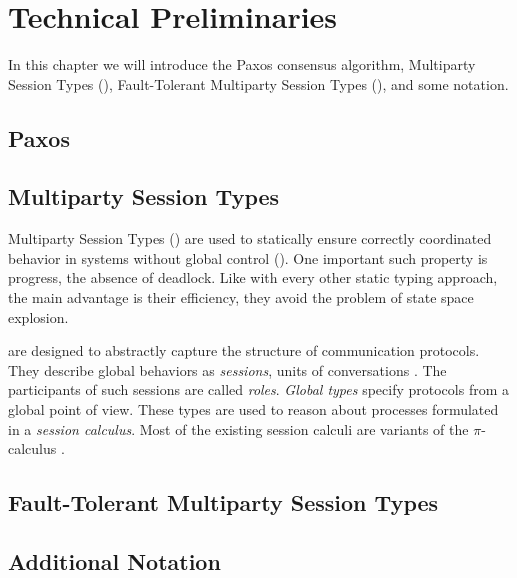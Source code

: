 \chapter{Technical Preliminaries}
In this chapter we will introduce the Paxos consensus algorithm, Multiparty Session Types (\MPST), Fault-Tolerant Multiparty Session Types (\FTMPST), and some notation.
\section{Paxos}

\section{Multiparty Session Types}
Multiparty Session Types (\MPST) are used to statically ensure correctly coordinated behavior in systems without global control (\cite{hondaYoshidaCarbone16,CoppoEtal15}).
One important such property is progress, \ie the absence of deadlock. Like with every other static typing approach, the main advantage is their efficiency, \ie they avoid the problem of state space explosion.

\MPST are designed to abstractly capture the structure of communication protocols.
They describe global behaviors as \emph{sessions}, \ie units of
conversations \cite{hondaYoshidaCarbone16,BettiniEtal08,BocciEtal10}. The participants of such sessions are called \emph{roles}.
\emph{Global types} specify protocols from a global point of view.
These types are used to reason about processes formulated
in a \emph{session calculus}. Most of the existing session calculi are
variants of the $ \pi $-calculus \cite{MilnerParrowWalker92}.

\section{Fault-Tolerant Multiparty Session Types}

\section{Additional Notation}
